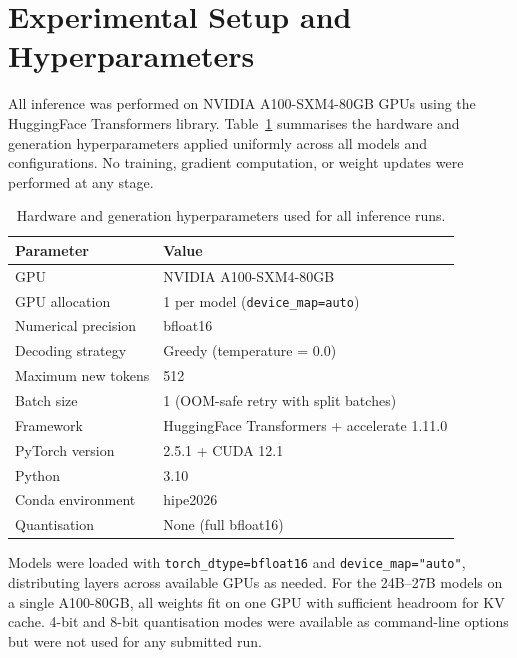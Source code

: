 \documentclass[
]{ceurart}
\theoremstyle{definition}
\begin{document}
\section{Experimental Setup and Hyperparameters}
\label{app:setup}

All inference was performed on NVIDIA A100-SXM4-80GB GPUs using the HuggingFace Transformers library.
Table~\ref{tab:setup} summarises the hardware and generation hyperparameters applied uniformly across all models and configurations.
No training, gradient computation, or weight updates were performed at any stage.

\begin{table}[h]
\centering
\caption{Hardware and generation hyperparameters used for all inference runs.}
\label{tab:setup}
\begin{tabular}{ll}
\toprule
\textbf{Parameter} & \textbf{Value} \\
\midrule
GPU                  & NVIDIA A100-SXM4-80GB \\
GPU allocation       & 1 per model (\texttt{device\_map=auto}) \\
Numerical precision  & bfloat16 \\
Decoding strategy    & Greedy (temperature = 0.0) \\
Maximum new tokens   & 512 \\
Batch size           & 1 (OOM-safe retry with split batches) \\
Framework            & HuggingFace Transformers + accelerate 1.11.0 \\
PyTorch version      & 2.5.1 + CUDA 12.1 \\
Python               & 3.10 \\
Conda environment    & hipe2026 \\
Quantisation         & None (full bfloat16) \\
\bottomrule
\end{tabular}
\end{table}

Models were loaded with \texttt{torch\_dtype=bfloat16} and \texttt{device\_map="auto"}, distributing layers across available GPUs as needed.
For the 24B--27B models on a single A100-80GB, all weights fit on one GPU with sufficient headroom for KV cache.
4-bit and 8-bit quantisation modes were available as command-line options but were not used for any submitted run.


\end{document}
